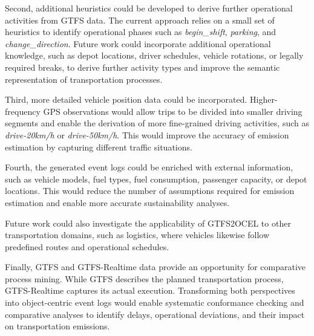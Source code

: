 Second, additional heuristics could be developed to derive further operational activities from GTFS data. The current approach relies on a small set of heuristics to identify operational phases such as \textit{begin\_shift}, \textit{parking}, and \textit{change\_direction}. Future work could incorporate additional operational knowledge, such as depot locations, driver schedules, vehicle rotations, or legally required breaks, to derive further activity types and improve the semantic representation of transportation processes.

Third, more detailed vehicle position data could be incorporated. Higher-frequency GPS observations would allow trips to be divided into smaller driving segments and enable the derivation of more fine-grained driving activities, such as \textit{drive-20km/h} or \textit{drive-50km/h}. This would improve the accuracy of emission estimation by capturing different traffic situations.

Fourth, the generated event logs could be enriched with external information, such as vehicle models, fuel types, fuel consumption, passenger capacity, or depot locations. This would reduce the number of assumptions required for emission estimation and enable more accurate sustainability analyses.

Future work could also investigate the applicability of GTFS2OCEL to other transportation domains, such as logistics, where vehicles likewise follow predefined routes and operational schedules.

Finally, GTFS and GTFS-Realtime data provide an opportunity for comparative process mining. While GTFS describes the planned transportation process, GTFS-Realtime captures its actual execution. Transforming both perspectives into object-centric event logs would enable systematic conformance checking and comparative analyses to identify delays, operational deviations, and their impact on transportation emissions.